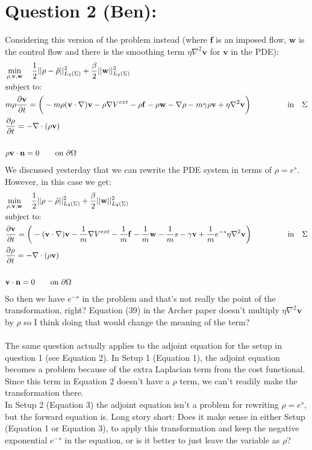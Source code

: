 \documentclass[11pt, a4paper]{article}
\theoremstyle{definition}
\newcommand{\Sta}{\rho}
\newcommand{\Stav}{\mathbf{v}}
\newcommand{\Con}{\mathbf{f}}
\begin{document}
\section{Question 2 (Ben):}
Considering this version of the problem instead
(where $\Con$ is an imposed flow, $\mathbf{w}$ is the control flow and there is the smoothing term $\eta \nabla^2 \Stav$ for $\Stav$ in the PDE):
\begin{align}
&\min_{\Sta,\Stav,\mathbf{w}} \quad \frac{1}{2}|| \Sta - \hat \Sta ||_{L_2(\Sigma)}^2  +\frac{\beta}{2}||\mathbf{w}||_{L_2(\Sigma)}^2\\
&\text{subject to:} \notag\\
& m \Sta \frac{\partial \Stav}{\partial t} = \bigg(- m \Sta (\Stav \cdot \nabla)\Stav - \Sta \nabla V^{ext} - \Sta \Con - \Sta \mathbf{w} - \nabla \Sta - m \gamma \Sta \Stav + \eta \nabla^2 \Stav \bigg) \ \ \ \qquad \ \ \quad\text{in} \quad \Sigma \notag\\
&\frac{\partial \Sta}{\partial t} = - \nabla \cdot (\Sta \Stav) \notag\\
\notag \\
&\Sta \Stav \cdot \mathbf{n} =0	\qquad\text{on } \partial \Omega \notag
\end{align}
We discussed yesterday that we can rewrite the PDE system in terms of $\rho = e^s$. However, in this case we get:
\begin{align*}
&\min_{\Sta,\Stav,\mathbf{w}} \quad \frac{1}{2}|| \Sta - \hat \Sta ||_{L_2(\Sigma)}^2  +\frac{\beta}{2}||\mathbf{w}||_{L_2(\Sigma)}^2\\
&\text{subject to:} \notag\\
&\frac{\partial \Stav}{\partial t} = \bigg(-  (\Stav \cdot \nabla)\Stav - \frac{1}{m} \nabla V^{ext} - \frac{1}{m} \Con - \frac{1}{m} \mathbf{w} - \frac{1}{m } s-  \gamma \Stav + \frac{1}{m}e^{-s}\eta \nabla^2 \Stav \bigg) \ \ \ \qquad \ \ \quad\text{in} \quad \Sigma \notag \\
&\frac{\partial \Sta}{\partial t} = - \nabla \cdot (\Sta \Stav) \notag \\
\notag \\
& \Stav \cdot \mathbf{n} =0	\qquad\text{on } \partial \Omega \notag
\end{align*} 
So then we have $e^{-s}$ in the problem and that's not really the point of the transformation, right? Equation (39) in the Archer paper doesn't multiply $\eta \nabla^2 \Stav$ by $\rho$ so I think doing that would change the meaning of the term?
\\
\\
The same question actually applies to the adjoint equation for the setup in question 1 (see Equation 2). In Setup 1 (Equation 1), the adjoint equation becomes a problem because of the extra Laplacian term from the cost functional. Since this term in Equation 2 doesn't have a $\rho$ term, we can't readily make the transformation there.\\
In Setup 2 (Equation 3) the adjoint equation isn't a problem for rewriting $\rho = e^s$, but the forward equation is.
Long story short: Does it make sense in either Setup (Equation 1 or Equation 3), to apply this transformation and keep the negative exponential $e^{-s}$ in the equation, or is it better to just leave the variable as $\rho$?
\end{document}
